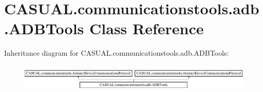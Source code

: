 \hypertarget{class_c_a_s_u_a_l_1_1communicationstools_1_1adb_1_1_a_d_b_tools}{\section{C\-A\-S\-U\-A\-L.\-communicationstools.\-adb.\-A\-D\-B\-Tools Class Reference}
\label{class_c_a_s_u_a_l_1_1communicationstools_1_1adb_1_1_a_d_b_tools}
}
Inheritance diagram for C\-A\-S\-U\-A\-L.\-communicationstools.\-adb.\-A\-D\-B\-Tools\-:\begin{figure}[H]
\begin{center}
\leavevmode
\includegraphics[height=1.339713cm]{class_c_a_s_u_a_l_1_1communicationstools_1_1adb_1_1_a_d_b_tools}
\end{center}
\end{figure}
